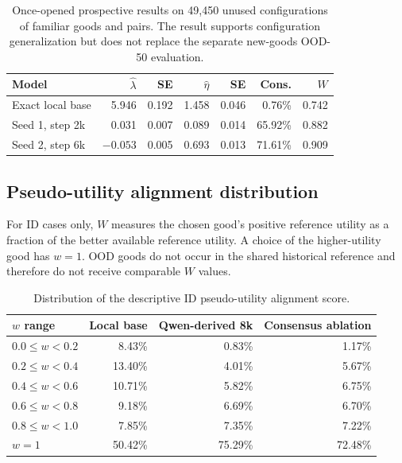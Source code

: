 \documentclass[11pt,letterpaper]{article}
\begin{document}
\begin{table}[htbp]
\centering
\small
\begin{tabular}{lrrrrrr}
\toprule
Model & $\widehat\lambda$ & SE & $\widehat\eta$ & SE & Cons. & $W$ \\
\midrule
Exact local base & 5.946 & 0.192 & 1.458 & 0.046 & 0.76\% & 0.742 \\
Seed 1, step 2k & 0.031 & 0.007 & 0.089 & 0.014 & 65.92\% & 0.882 \\
Seed 2, step 6k & $-0.053$ & 0.005 & 0.693 & 0.013 & 71.61\% & 0.909 \\
\bottomrule
\end{tabular}
\caption{Once-opened prospective results on 49,450 unused configurations of
familiar goods and pairs. The result supports configuration generalization but
does not replace the separate new-goods OOD-50 evaluation.}
\label{tab:frozen-unused}
\end{table}

\subsection{Pseudo-utility alignment distribution}

For ID cases only, $W$ measures the chosen good's positive reference utility
as a fraction of the better available reference utility. A choice of the
higher-utility good has $w=1$. OOD goods do not occur in the shared historical
reference and therefore do not receive comparable $W$ values.

\begin{table}[htbp]
\centering
\small
\begin{tabular}{lrrr}
\toprule
$w$ range & Local base & Qwen-derived 8k & Consensus ablation \\
\midrule
$0.0\leq w<0.2$ & 8.43\% & 0.83\% & 1.17\% \\
$0.2\leq w<0.4$ & 13.40\% & 4.01\% & 5.67\% \\
$0.4\leq w<0.6$ & 10.71\% & 5.82\% & 6.75\% \\
$0.6\leq w<0.8$ & 9.18\% & 6.69\% & 6.70\% \\
$0.8\leq w<1.0$ & 7.85\% & 7.35\% & 7.22\% \\
$w=1$ & 50.42\% & 75.29\% & 72.48\% \\
\bottomrule
\end{tabular}
\caption{Distribution of the descriptive ID pseudo-utility alignment score.}
\label{tab:w-distribution}
\end{table}
\end{document}
